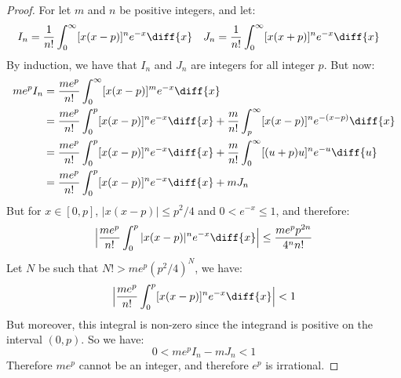         \begin{proof}
            For let $m$ and $n$ be positive integers, and let:
            \begin{align*}
                I_{n}
                &=\frac{1}{n!}
                    \int_{0}^{\infty}[x(x-p)]^{n}e^{-x}\diff{x}
                &
                J_{n}
                &=\frac{1}{n!}
                    \int_{0}^{\infty}[x(x+p)]^{n}e^{-x}\diff{x}
            \end{align*}
            By induction, we have that $I_{n}$ and $J_{n}$ are
            integers for all integer $p$. But now:
            \begin{align*}
                me^{p}I_{n}
                &=\frac{me^{p}}{n!}
                    \int_{0}^{\infty}[x(x-p)]^{m}e^{-x}\diff{x}\\
                &=\frac{me^{p}}{n!}
                    \int_{0}^{p}[x(x-p)]^{n}e^{-x}\diff{x}
                 +\frac{m}{n!}
                    \int_{p}^{\infty}[x(x-p)]^{n}e^{-(x-p)}\diff{x}\\
                &=\frac{me^{p}}{n!}
                    \int_{0}^{p}[x(x-p)]^{n}e^{-x}\diff{x}+
                    \frac{m}{n!}
                        \int_{0}^{\infty}[(u+p)u]^{n}e^{-u}\diff{u}\\
                &=\frac{me^{p}}{n!}
                    \int_{0}^{p}[x(x-p)]^{n}e^{-x}\diff{x}+mJ_{n}
            \end{align*}
            But for $x\in[0,p]$, $|x(x-p)|\leq{p^{2}/4}$ and
            $0<e^{-x}\leq{1}$, and therefore:
            \begin{equation*}
                \Big|\frac{me^{p}}{n!}
                    \int_{0}^{p}|x(x-p)|^{n}e^{-x}\diff{x}\Big|
                \leq\frac{me^{p}p^{2n}}{4^{n}n!}
            \end{equation*}
            Let $N$ be such that $N!>me^{p}(p^{2}/4)^{N}$, we have:
            \begin{equation*}
                \Big|\frac{me^{p}}{n!}
                    \int_{0}^{p}[x(x-p)]^{n}e^{-x}\diff{x}\Big|<1
            \end{equation*}
            But moreover, this integral is non-zero since
            the integrand is positive on the interval $(0,p)$.
            So we have:
            \begin{equation*}
                0<me^{p}I_{n}-mJ_{n}<1
            \end{equation*}
            Therefore $me^{p}$ cannot be an integer, and therefore
            $e^{p}$ is irrational.
        \end{proof}
